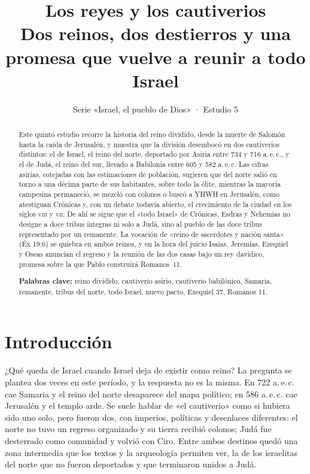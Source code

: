 \title{\color{ladrillo}\bfseries Los reyes y los cautiverios\\[4pt]\large\color{cafe}\mdseries Dos reinos, dos destierros y una promesa que vuelve a reunir a todo Israel}
\author{}\date{\color{sepia}Serie «Israel, el pueblo de Dios» · Estudio 5}

\maketitle\thispagestyle{empty}

\begin{abstract}\noindent
Este quinto estudio recorre la historia del reino dividido, desde la muerte de Salomón hasta la caída de Jerusalén, y muestra que la división desembocó en dos cautiverios distintos: el de Israel, el reino del norte, deportado por Asiria entre 734 y 716 a.\,e.\,c., y el de Judá, el reino del sur, llevado a Babilonia entre 605 y 582 a.\,e.\,c. Las cifras asirias, cotejadas con las estimaciones de población, sugieren que del norte salió en torno a una décima parte de sus habitantes, sobre todo la élite, mientras la mayoría campesina permaneció, se mezcló con colonos o buscó a YHWH en Jerusalén, como atestiguan Crónicas y, con un debate todavía abierto, el crecimiento de la ciudad en los siglos \textsc{viii} y \textsc{vii}. De ahí se sigue que el «todo Israel» de Crónicas, Esdras y Nehemías no designe a doce tribus íntegras ni solo a Judá, sino al pueblo de las doce tribus representado por un remanente. La vocación de «reino de sacerdotes y nación santa» (Éx 19:6) se quiebra en ambos reinos, y en la hora del juicio Isaías, Jeremías, Ezequiel y Oseas anuncian el regreso y la reunión de las dos casas bajo un rey davídico, promesa sobre la que Pablo construirá Romanos~11.
\par\smallskip\noindent\textbf{Palabras clave:} reino dividido, cautiverio asirio, cautiverio babilónico, Samaria, remanente, tribus del norte, todo Israel, nuevo pacto, Ezequiel 37, Romanos 11.
\end{abstract}

\section{Introducción}

¿Qué queda de Israel cuando Israel deja de existir como reino? La pregunta se plantea dos veces en este período, y la respuesta no es la misma. En 722 a.\,e.\,c. cae Samaria y el reino del norte desaparece del mapa político; en 586 a.\,e.\,c. cae Jerusalén y el templo arde. Se suele hablar de «el cautiverio» como si hubiera sido uno solo, pero fueron dos, con imperios, políticas y desenlaces diferentes: el norte no tuvo un regreso organizado y su tierra recibió colonos; Judá fue desterrado como comunidad y volvió con Ciro. Entre ambos destinos quedó una zona intermedia que los textos y la arqueología permiten ver, la de los israelitas del norte que no fueron deportados y que terminaron unidos a Judá.


